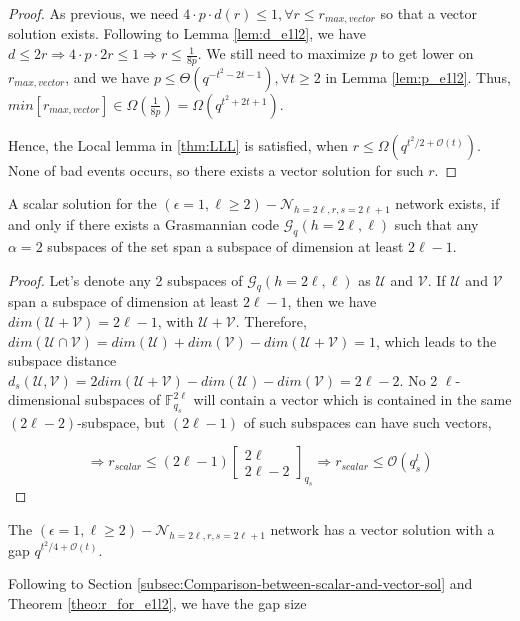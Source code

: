\begin{proof}
As previous, we need $4\cdot p\cdot d(r)\leq1,\forall r\leq r_{max,vector}$
so that a vector solution exists. Following to Lemma \ref{lem:d_e1l2},
we have $d\leq2r\Rightarrow4\cdot p\cdot2r\leq1\Rightarrow r\leq\frac{1}{8p}$.
We still need to maximize $p$ to get lower on $r_{max,vector}$,
and we have $p\leq\Theta\left(q^{-t^{2}-2t-1}\right),\forall t\geq2$
in Lemma \ref{lem:p_e1l2}. Thus, $min\left[r_{max,vector}\right]\in\Omega\left(\frac{1}{8p}\right)=\Omega\left(q^{t^{2}+2t+1}\right)$.

Hence, the Local lemma in \ref{thm:LLL} is satisfied, when $r\leq\Omega\left(q^{t^{2}/2+\mathcal{O}\left(t\right)}\right)$.
None of bad events occurs, so there exists a vector solution for such
$r$.
\end{proof}
\begin{lem}
A scalar solution for the $\left(\epsilon=1,\ell\geq2\right)-\mathcal{N}_{h=2\ell,r,s=2\ell+1}$
network exists, if and only if there exists a Grasmannian code $\mathcal{G}_{q}\left(h=2\ell,\ell\right)$
such that any $\alpha=2$ subspaces of the set span a subspace of
dimension at least $2\ell-1$. 
\end{lem}
\begin{proof}
Let's denote any 2 subspaces of $\mathcal{G}_{q}\left(h=2\ell,\ell\right)$
as $\mathcal{U}$ and $\mathcal{V}$. If $\mathcal{U}$ and $\mathcal{V}$
span a subspace of dimension at least $2\ell-1$, then we have $dim\left(\mathcal{U}+\mathcal{V}\right)=2\ell-1$,
with $\mathcal{U}+\mathcal{V}$. Therefore, $dim\left(\mathcal{U}\cap\mathcal{V}\right)=dim\left(\mathcal{U}\right)+dim\left(\mathcal{V}\right)-dim\left(\mathcal{U}+\mathcal{V}\right)=1$,
which leads to the subspace distance $d_{s}(\mathcal{U},\mathcal{V})=2dim\left(\mathcal{U}+\mathcal{V}\right)-dim\left(\mathcal{U}\right)-dim\left(\mathcal{V}\right)=2\ell-2$.
No 2 $\ell$-dimensional subspaces of $\ensuremath{\mathbb{F}}_{q_{s}}^{2\ell}$
will contain a vector which is contained in the same $\left(2\ell-2\right)$-subspace,
but $\left(2\ell-1\right)$ of such subspaces can have such vectors, 

\[
\Rightarrow r_{scalar}\leq\left(2\ell-1\right)\left[\begin{array}{c}
2\ell\\
2\ell-2
\end{array}\right]_{q_{s}}\Rightarrow r_{scalar}\leq\mathcal{O}\left(q_{s}^{l}\right)
\]
\end{proof}
\begin{cor}
The $\left(\epsilon=1,\ell\geq2\right)-\mathcal{N}_{h=2\ell,r,s=2\ell+1}$
network has a vector solution with a gap $q^{t^{2}/4+\mathcal{O}(t)}$.
\end{cor}
Following to Section \ref{subsec:Comparison-between-scalar-and-vector-sol}
and Theorem \ref{theo:r_for_e1l2}, we have the gap size 

